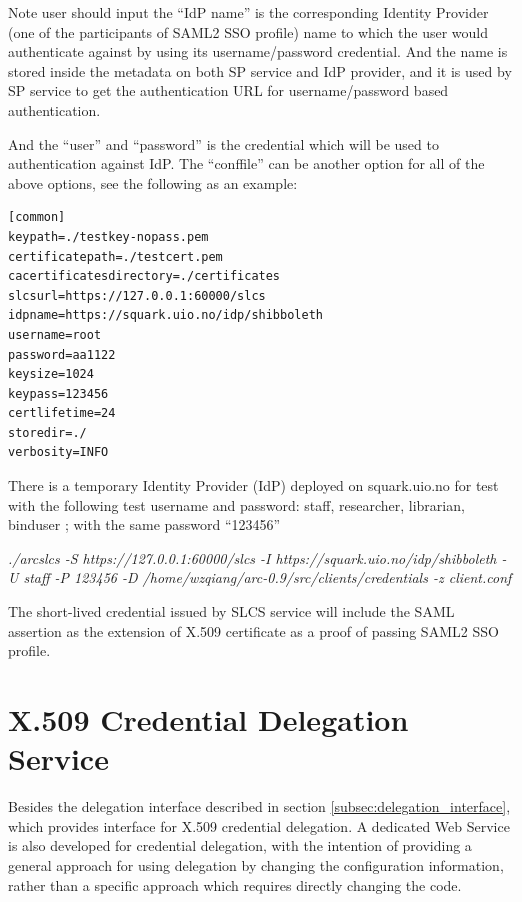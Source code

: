 \documentclass{article}                            %
\begin{document}
    Note user should input the ``IdP name'' is the corresponding Identity Provider (one of the participants of SAML2 SSO profile) name to which the user would authenticate against by using its username/password credential. And the name is stored inside the metadata on both SP service and IdP provider, and it is used by SP service to get the authentication URL for username/password based authentication.

    And the ``user'' and ``password'' is the credential which will be used to authentication against IdP.
The ``conffile'' can be another option for all of the above options, see the following as an example:

\begin{verbatim}
[common]
keypath=./testkey-nopass.pem
certificatepath=./testcert.pem
cacertificatesdirectory=./certificates
slcsurl=https://127.0.0.1:60000/slcs
idpname=https://squark.uio.no/idp/shibboleth
username=root
password=aa1122
keysize=1024
keypass=123456
certlifetime=24
storedir=./
verbosity=INFO
\end{verbatim}

    There is a temporary Identity Provider (IdP) deployed on squark.uio.no for test with the following test username and password: staff, researcher, librarian, binduser ; with the same password ``123456''

\textit{./arcslcs -S https://127.0.0.1:60000/slcs -I https://squark.uio.no/idp/shibboleth -U staff -P 123456 -D /home/wzqiang/arc-0.9/src/clients/credentials -z client.conf}

    The short-lived credential issued by SLCS service will include the SAML assertion as the extension of X.509 certificate as a proof of passing SAML2 SSO profile.





\section{X.509 Credential Delegation Service} %
\label{sec:delegation_service}
Besides the delegation interface described in section \ref{subsec:delegation_interface}, which provides interface for X.509 credential delegation. A dedicated Web Service is also developed for credential delegation, with the intention of providing a general approach for using delegation by changing the configuration information, rather than a specific approach which requires directly changing the code.
\end{document}
